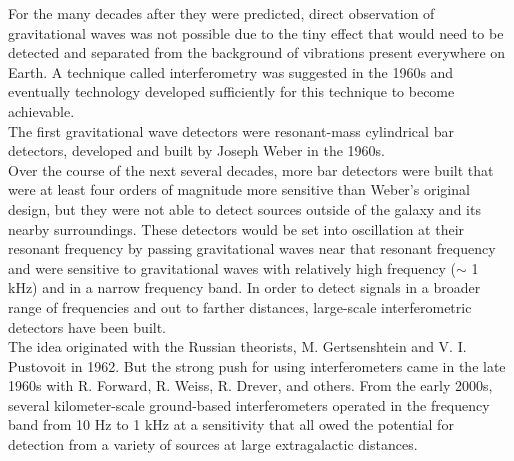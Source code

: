 \documentclass[binding=0.6cm, LaM]{sapthesis}
\begin{document}
	For the many decades after they were predicted, direct observation of gravitational waves was not possible 
	due to the tiny effect that would need to be detected and separated from the background of vibrations present everywhere on Earth.
	A technique called interferometry was suggested in the 1960s and eventually technology developed  
	sufficiently for this technique to become achievable. \\
	The first gravitational wave detectors were resonant-mass cylindrical bar detectors, 
	developed and built by Joseph Weber in the 1960s. \\
	Over the course of the next several decades, more bar detectors were built that were at least 
	four orders of magnitude more sensitive than Weber’s original design, 
	but they were not able to detect sources outside of the galaxy and its nearby surroundings.
	These detectors would be set into oscillation at their resonant frequency by passing gravitational waves 
	near that resonant frequency and were sensitive to gravitational waves with relatively high frequency ($\sim$ 1 kHz) 
	and in a narrow frequency band. In order to detect signals in a broader range of frequencies and out to farther distances, 
	large-scale interferometric detectors have been built. \\ 
	The idea originated with the Russian theorists, M. Gertsenshtein and V. I. Pustovoit in 1962. 
	But the strong push for using interferometers came in the late 1960s with R. Forward, R. Weiss, 
	R. Drever, and others. From the early 2000s, several kilometer-scale ground-based interferometers 
	operated in the frequency band from 10 Hz to 1 kHz at a sensitivity that all
	owed the potential for detection from a variety of sources at large extragalactic distances.
\end{document}
